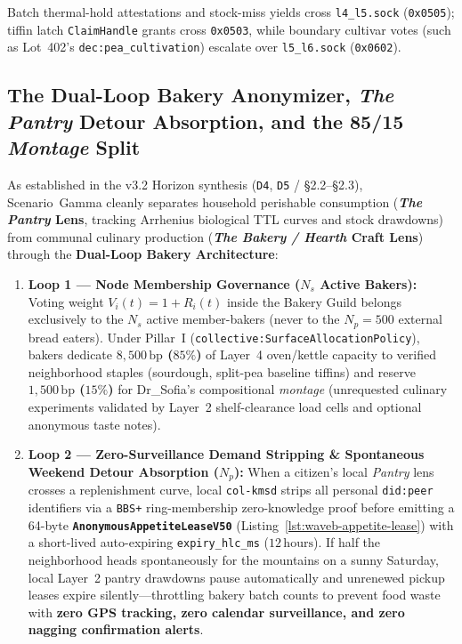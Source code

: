 Batch thermal-hold attestations and stock-miss yields cross \texttt{l4\_l5.sock} (\texttt{0x0505});
tiffin latch \texttt{ClaimHandle} grants cross \texttt{0x0503}, while boundary cultivar votes
(such as Lot~402's \texttt{dec:pea\_cultivation}) escalate over \texttt{l5\_l6.sock} (\texttt{0x0602}).

\subsection{The Dual-Loop Bakery Anonymizer, \textit{The Pantry} Detour Absorption, and the 85/15 \textit{Montage} Split}

As established in the v3.2 Horizon synthesis (\texttt{D4}, \texttt{D5} / \S2.2--\S2.3), Scenario~Gamma
cleanly separates household perishable consumption (\textbf{\textit{The Pantry} Lens}, tracking
Arrhenius biological TTL curves and stock drawdowns) from communal culinary production
(\textbf{\textit{The Bakery / Hearth} Craft Lens}) through the \textbf{Dual-Loop Bakery Architecture}:
\begin{enumerate}
\item \textbf{Loop 1 --- Node Membership Governance ($N_s$ Active Bakers):} Voting weight
        $V_i(t) = 1 + R_i(t)$ inside the Bakery Guild belongs exclusively to the $N_s$ active
        member-bakers (never to the $N_p = 500$ external bread eaters). Under Pillar~I
        (\texttt{collective:SurfaceAllocationPolicy}), bakers dedicate \textbf{$8{,}500\,\mathrm{bp}$
        ($85\%$)} of Layer~4 oven/kettle capacity to verified neighborhood staples (sourdough,
        split-pea baseline tiffins) and reserve \textbf{$1{,}500\,\mathrm{bp}$ ($15\%$)} for
        Dr\_Sofia's compositional \textit{montage} (unrequested culinary experiments validated by
        Layer~2 shelf-clearance load cells and optional anonymous taste notes).
\item \textbf{Loop 2 --- Zero-Surveillance Demand Stripping \& Spontaneous Weekend Detour Absorption ($N_p$):}
        When a citizen's local \textit{Pantry} lens crosses a replenishment curve, local
        \texttt{col-kmsd} strips all personal \texttt{did:peer} identifiers via a \texttt{BBS+}
        ring-membership zero-knowledge proof before emitting a 64-byte
        \textbf{\texttt{AnonymousAppetiteLeaseV50}} (Listing~\ref{lst:waveb-appetite-lease}) with a
        short-lived auto-expiring \texttt{expiry\_hlc\_ms} ($12\,\mathrm{hours}$). If half the
        neighborhood heads spontaneously for the mountains on a sunny Saturday, local Layer~2
        pantry drawdowns pause automatically and unrenewed pickup leases expire silently---throttling
        bakery batch counts to prevent food waste with \textbf{zero GPS tracking, zero calendar
        surveillance, and zero nagging confirmation alerts}.
\end{enumerate}

